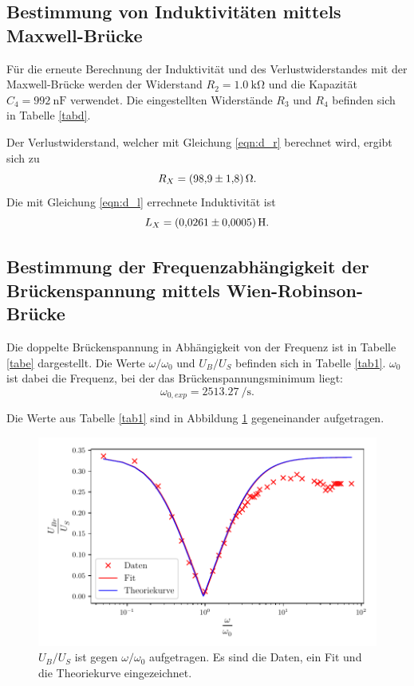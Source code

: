 \subsection{Bestimmung von Induktivitäten mittels Maxwell-Brücke}
Für die erneute Berechnung der Induktivität und des Verlustwiderstandes mit der Maxwell-Brücke werden der Widerstand
$R_2 = \SI{1.0}{\kilo\ohm}$ und die Kapazität $C_4 = \SI{992}{\nano\farad}$ verwendet.
Die eingestellten Widerstände $R_3$ und $R_4$ befinden sich in Tabelle \ref{tabd}.

\noindent Der Verlustwiderstand, welcher mit Gleichung \eqref{eqn:d_r} berechnet wird, ergibt sich zu
\begin{equation*}
    R_X = \SI{98.9 \pm 1.8}{\ohm}.
\end{equation*}
Die mit Gleichung \eqref{eqn:d_l} errechnete Induktivität ist
\begin{equation*}
    L_X = \SI{0.0261 \pm 0.0005}{\henry}.
\end{equation*}

\subsection{Bestimmung der Frequenzabhängigkeit der Brückenspannung mittels Wien-Robinson-Brücke}
Die doppelte Brückenspannung in Abhängigkeit von der Frequenz ist in Tabelle \ref{tabe} dargestellt.
Die Werte $\omega / \omega_0$ und $U_B / U_S$ befinden sich in Tabelle \ref{tab1}.
$\omega_0$ ist dabei die Frequenz, bei der das Brückenspannungsminimum liegt:
\begin{equation*}
    \omega_{0,exp} = \SI[per-mode=fraction]{2513.27}{\per\second}.
\end{equation*}


\noindent Die Werte aus Tabelle \ref{tab1} sind in Abbildung \ref{fig:plot} gegeneinander aufgetragen.
\begin{figure}
 \centering
 \includegraphics{build/plot1.pdf}
 \caption{$U_B/U_S$ ist gegen $\omega / \omega_0$ aufgetragen. Es sind die Daten, ein Fit und die
 Theoriekurve eingezeichnet.}
 \label{fig:plot}
\end{figure}

